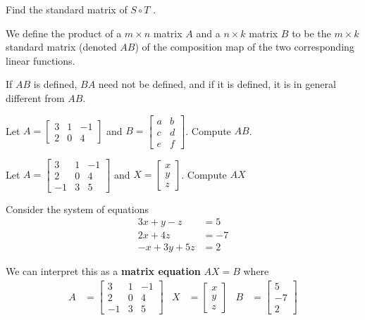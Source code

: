 \begin{applicationActivities}{1}{21}
\begin{activity}{5}
  Find the standard matrix of $S \circ T$ .
\end{activity}

\begin{definition}
We define the product of a $m \times n$ matrix $A$ and a $n \times k$ matrix $B$ to be the $m \times k$ standard matrix (denoted $AB$) of the composition map of the two corresponding linear functions.
\end{definition}

\begin{fact}
If $AB$ is defined, $BA$ need not be defined, and if it is defined, it is in general different from $AB$.
\end{fact}

\begin{activity}{10}
Let $A=\begin{bmatrix} 3 & 1 & -1 \\ 2 & 0 & 4  \end{bmatrix}$ and $B=\begin{bmatrix} a & b \\ c & d\\ e & f \end{bmatrix}$.  Compute $AB$.
\end{activity}


\begin{activity}{5}
Let $A=\begin{bmatrix} 3 & 1 & -1 \\ 2 & 0 & 4 \\ -1 & 3 & 5 \end{bmatrix}$ and $X=\begin{bmatrix} x \\ y \\ z \end{bmatrix}$.
Compute $AX$
\end{activity}

\begin{observation}
Consider the  system of equations
\begin{align*}
3x+y-z &= 5 \\ 2x+4z &= -7 \\ -x+3y+5z &=2
\end{align*}

We can interpret this as a {\bf matrix equation} $AX=B$ where 
\begin{align*}
A&=\begin{bmatrix} 3 & 1 & -1 \\ 2 & 0 & 4 \\ -1 & 3 & 5  \end{bmatrix} & X&=\begin{bmatrix} x  \\ y \\ z  \end{bmatrix} & B &= \begin{bmatrix} 5 \\ -7 \\ 2 \end{bmatrix}
\end{align*}
\end{observation}

\end{applicationActivities}
